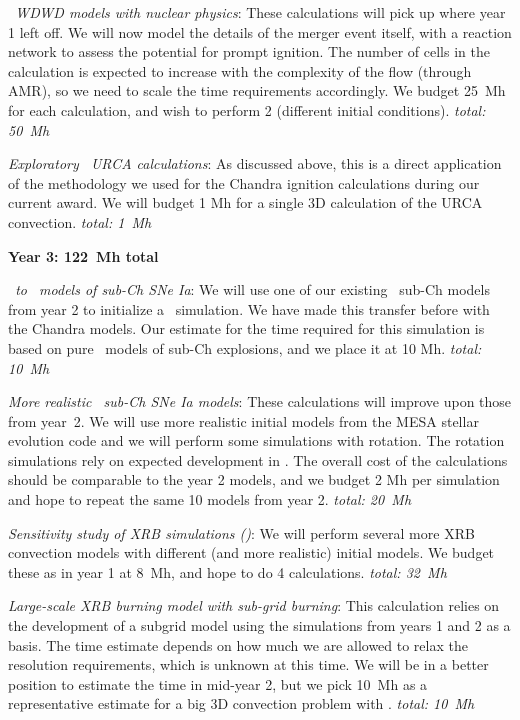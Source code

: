 \documentclass[11pt,letterpaper,english]{article}
\begin{document}
\begin{tightitem}
\begin{tightitem}
\item {\em \castro\ WDWD models with nuclear physics}:
  These calculations will pick up where year 1 left off.  We will now 
  model the details of the merger event itself, with a reaction network
  to assess the potential for prompt ignition.  The number of cells 
  in the calculation is expected to increase with the complexity of 
  the flow (through AMR), so we need to scale the time requirements
  accordingly.  We budget 25~Mh for each calculation, and wish to 
  perform 2 (different initial conditions). {\em total: 50~Mh}

\item {\em Exploratory \maestro\ URCA calculations}:  As discussed
  above, this is a direct application of the methodology we used
  for the Chandra ignition calculations during our current award.
  We will budget 1 Mh for a single 3D calculation of the URCA
  convection.  {\em total: 1~Mh}
\end{tightitem}
%
\item {\bf Year 3: 122~Mh total}
%
\begin{tightitem}
\item {\em \maestro\ to \castro\ models of sub-Ch SNe Ia}: 
   We will use one of our existing \maestro\ sub-Ch models from year 2
   to initialize a \castro\ simulation.  We have made this
   transfer before with the Chandra models.  Our estimate for
   the time required for this simulation is based on pure \castro\
   models of sub-Ch explosions, and we place it at 10 Mh.  {\em total: 10~Mh}

\item {\em More realistic \maestro\ sub-Ch SNe Ia models}: These
  calculations will improve upon those from year~2.  We will use more
  realistic initial models from the MESA stellar evolution code and we
  will perform some simulations with rotation.  The rotation
  simulations rely on expected development in \maestro.  The overall
  cost of the calculations should be comparable to the year 2 models,
  and we budget 2 Mh per simulation and hope to repeat the same 10
  models from year 2.  {\em total: 20~Mh}

\item {\em Sensitivity study of XRB simulations (\maestro)}:
   We will perform several more XRB convection models with different
   (and more realistic) initial models.  We budget these as in year 1
   at 8~Mh, and hope to do 4 calculations.  {\em total: 32~Mh}
   
\item {\em Large-scale XRB burning model with sub-grid burning}:
  This calculation relies on the development of a subgrid model
  using the simulations from years 1 and 2 as a basis.  The time estimate
  depends on how much we are allowed to relax the resolution requirements,
  which is unknown at this time.  We will be in a better position to
  estimate the time in mid-year 2, but we pick 10~Mh as a representative
  estimate for a big 3D convection problem with \maestro.  {\em total: 10~Mh}


\end{tightitem}
\end{tightitem}
\end{document}
